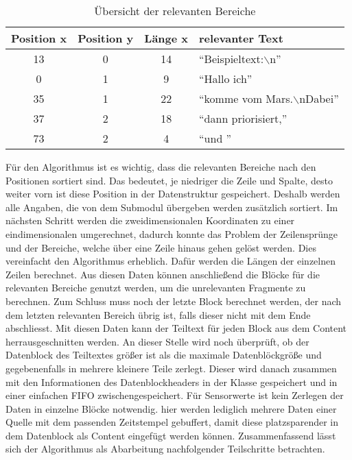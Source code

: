 \begin{longtable}{|cccl|}
\caption{Übersicht der relevanten Bereiche} \\
\hline
\label{tab:UebersichtDerRelevantenBereiche}
\textbf{Position x} & \textbf{Position y} & \textbf{Länge x} &
\textbf{relevanter Text}\\
\hline
  13 &  0 & 14 & "`Beispieltext:\ensuremath{\backslash}n"' \\
   0 &  1 &  9 & "`Hallo ich"' \\
  35 &  1 & 22 & "`komme vom Mars.\ensuremath{\backslash}nDabei"' \\
  37 &  2 & 18 & "`dann priorisiert,"' \\
  73 &  2 &  4 & "`und "' \\
\hline
\end{longtable}

Für den Algorithmus ist es wichtig, dass die relevanten Bereiche nach den
Positionen sortiert sind. Das bedeutet, je niedriger die Zeile und Spalte,
desto weiter vorn ist diese Position in der Datenstruktur gespeichert.
Deshalb werden alle Angaben, die von dem Submodul  übergeben werden 
zusätzlich sortiert.
Im nächsten Schritt werden die zweidimensionalen Koordinaten zu einer
eindimensionalen umgerechnet, dadurch konnte das Problem der
Zeilensprünge und der Bereiche, welche über eine Zeile hinaus gehen
gelöst werden. Dies vereinfacht den Algorithmus erheblich. Dafür werden die
Längen der einzelnen Zeilen berechnet. Aus diesen Daten können anschließend die Blöcke für die
relevanten Bereiche genutzt werden, um die unrelevanten Fragmente zu berechnen.
Zum Schluss muss noch der letzte Block berechnet werden, der nach dem letzten
relevanten Bereich übrig ist, falls dieser nicht mit dem Ende abschliesst. Mit
diesen Daten kann der Teiltext für jeden Block aus dem Content
herrausgeschnitten werden. An dieser Stelle wird noch überprüft, ob der
Datenblock des Teiltextes größer ist als die maximale Datenblöckgröße und
gegebenenfalls in mehrere kleinere Teile zerlegt. Dieser wird danach zusammen
mit den Informationen des Datenblockheaders in der Klasse 
gespeichert und in einer einfachen FIFO zwischengespeichert. Für
Sensorwerte ist kein Zerlegen der Daten in einzelne Blöcke notwendig.
hier werden lediglich mehrere Daten einer Quelle mit dem passenden
Zeitstempel gebuffert, damit diese platzsparender in dem Datenblock als
Content eingefügt werden können. \newline
Zusammenfassend lässt sich der Algorithmus als Abarbeitung nachfolgender
Teilschritte betrachten.

